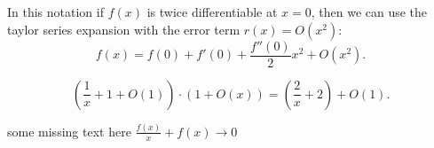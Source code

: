 \documentclass[a4paper]{article}
\begin{document}
\noindent\hrulefill 

In this notation if $f(x)$ is twice differentiable at $x=0$, then we can use the taylor series expansion with the error term $r(x) = O(x^{2})$:
 \[
f(x) = f(0) + f'(0) + \frac{f''(0)}{2} x^{2} + O(x^{2})
.\] 

\[
  (\frac{1}{x} + 1 + O(1)) \cdot \left( 1 + O(x) \right)  = \left( \frac{2}{x} + 2 \right) + O(1) 
.\] 

some missing text here
$\frac{f(x)}{x} + f(x) \to 0$
\end{document}
